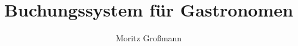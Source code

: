 


	
	\title{Buchungssystem für Gastronomen}
	\author{Moritz Großmann}
	\maketitle
	
	\newpage
	
	\tableofcontents
	
	\enlargethispage{1cm}
	
	
	
	
	
	
	
	
	
	
	
	
	
	
